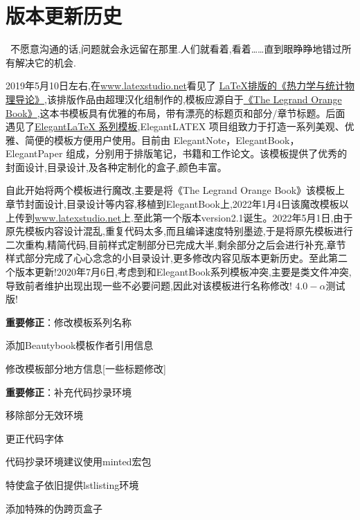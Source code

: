 \chapter{版本更新历史}
\begin{center}
\textcolor[RGB]{255, 0, 0}{\faHeart}~不愿意沟通的话,问题就会永远留在那里.人们就看着,看着……直到眼睁睁地错过所有解决它的机会.~\textcolor[RGB]{255, 0, 0}{\faHeart}
\end{center}
\begin{center}
\end{center}

2019年5月10日左右,在\href{latexstudio论坛}{www.latexstudio.net}看见了
\href{https://www.latexstudio.net/archives/10715.html}{LaTeX排版的《热力学与统计物理导论》},该排版作品由超理汉化组制作的,模板应源自于\href{http://www.latextemplates.com/template/the-legrand-orange-book}{《The Legrand Orange Book》},这本书模板具有优雅的布局，带有漂亮的标题页和部分/章节标题。后面遇见了\href{https://elegantlatex.org/}{Elegant\LaTeX{} 系列模板},ElegantLATEX 项目组致力于打造一系列美观、优雅、简便的模板方便用户使用。目前由
ElegantNote，ElegantBook，ElegantPaper 组成，分别用于排版笔记，书籍和工作论文。该模板提供了优秀的封面设计,目录设计,及各种定制化的盒子,颜色丰富。

自此开始将两个模板进行魔改,主要是将《The Legrand Orange Book》该模板上章节封面设计,目录设计等内容,移植到ElegantBook上,2022年1月4日该魔改模板以上传到\href{latexstudio论坛}{www.latexstudio.net}上.至此第一个版本version2.1诞生。2022年5月1日,由于原先模板内容设计混乱,重复代码太多,而且编译速度特别墨迹,于是将原先模板进行二次重构,精简代码,目前样式定制部分已完成大半,剩余部分之后会进行补充,章节样式部分完成了心心念念的小目录设计,更多修改内容见版本更新历史。至此第二个版本更新!2020年7月6日,考虑到和ElegantBook系列模板冲突,主要是类文件冲突,导致前者维护出现出现一些不必要问题,因此对该模板进行名称修改!
$4.0-\alpha$测试版!
\begin{change}
    \item \textbf{重要修正}：修改模板系列名称
    \item 添加Beautybook模板作者引用信息
    \item 修改模板部分地方信息[一些标题修改]
\end{change}


\begin{change}
    \item \textbf{重要修正}：补充代码抄录环境
    \item 移除部分无效环境
    \item 更正代码字体
    \item 代码抄录环境建议使用minted宏包
    \item 特使盒子依旧提供lstlisting环境
    \item 添加特殊的伪跨页盒子
\end{change}


